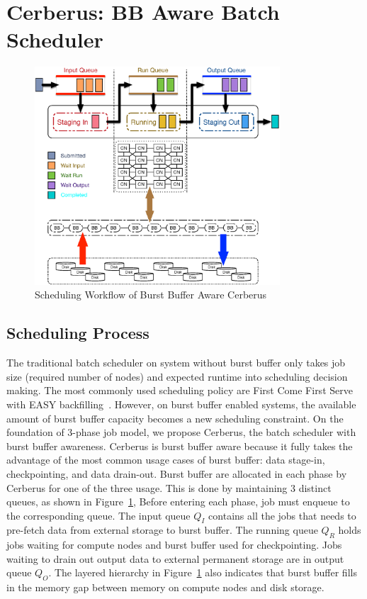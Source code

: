 \section{Cerberus: BB Aware Batch Scheduler}
\label{Sec:Scheduler}

\begin{figure}[!htbp]
        \centering
        \includegraphics[width=3.6in]{CerberusBBSystem}
        \caption{Scheduling Workflow of Burst Buffer Aware Cerberus}
        \label{Fig:CerberusQueues}
\end{figure}

\subsection{Scheduling Process}

The traditional batch scheduler on system without burst buffer only
takes job size (required number of nodes) and expected runtime into scheduling decision making. 
The most commonly used scheduling policy are First Come First Serve with
EASY backfilling~\cite{tsafrir-tpds-2007}.
However, on burst buffer enabled systems, 
the available amount of burst buffer capacity becomes a new scheduling constraint.
On the foundation of 3-phase job model,
we propose Cerberus, the batch scheduler with burst buffer awareness.
Cerberus is burst buffer aware because it fully takes the advantage of the 
most common usage cases of burst buffer: data stage-in, checkpointing, and data drain-out.
Burst buffer are allocated in each phase by Cerberus for one of the three usage.
This is done by maintaining 3 distinct queues, as shown in Figure~\ref{Fig:CerberusQueues},
Before entering each phase, job must enqueue to the corresponding queue.
The input queue $Q_I$ contains all the jobs that
needs to pre-fetch data from external storage to burst buffer.
The running queue $Q_R$ holds jobs
waiting for compute nodes and burst buffer used for checkpointing.
Jobs waiting to drain out output data to external permanent storage are in output queue $Q_O$.
The layered hierarchy in Figure~\ref{Fig:CerberusQueues} also indicates that
burst buffer fills in the memory gap between memory on compute nodes and disk storage.

